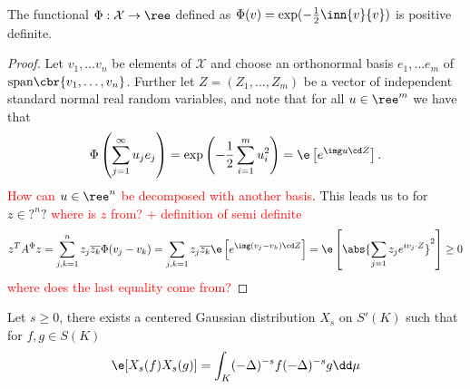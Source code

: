 \begin{lemma}\label{LambdaPosDefinite}
	The functional $\Phi: \mathcal{X} \to \ree$ defined as  $\Phi(v) = \exp(-\frac{1}{2} \inn{v}{v})$ is positive definite.
\end{lemma}
\begin{proof}
	Let $v_1, \ldots v_n$ be elements of $\mathcal{X}$ and choose an orthonormal basis $e_1, \ldots e_m$ of $\text{span}\cbr{v_1, \ldots, v_n}$. Further let $Z = (Z_1, \ldots, Z_m)$ be a vector of independent standard normal real random variables, and note that for all $u \in \ree^{m}$ we have that
	\begin{equation}
		\Phi \left(\sum_{j = 1}^{\infty} u_j e_j\right) = \exp \left(-\frac{1}{2} \sum_{i = 1}^{m} u_i^2\right) = \e \left[e^{ \img u \cd Z}\right].
	\end{equation}
	\textcolor{red}{How can $u \in \ree^{n}$ be decomposed with another basis}. This leads us to for $z \in ?^{n}?$ \textcolor{red}{where is $z$ from? + definition of semi definite}
	\begin{equation}
		z^{T}A^{\Phi}z =\sum_{j, k = 1}^{n}z_j \overline{z_k} \Phi(v_j - v_k) = \sum_{j,  k = 1} z_j \overline{z_k} \e \left[e^{\img (v_j -v_k) \cd Z}\right] = \e \left[\abs{\sum_{j = 1} z_j e^{i v_j \cdot Z}}^2\right] \geq 0
	\end{equation}
	\textcolor{red}{where does the last equality come from?}
\end{proof}

\begin{theorem}
	Let $s \geq 0$, there exists a centered Gaussian distribution $X_s$ on $S'(K)$ such that for $f,g \in S(K)$
	\begin{equation}
		\e[X_s(f)X_s(g)] = \int_{K} (-\Delta)^{-s}f (-\Delta)^{-s}g \dd \mu
	\end{equation}
\end{theorem}

